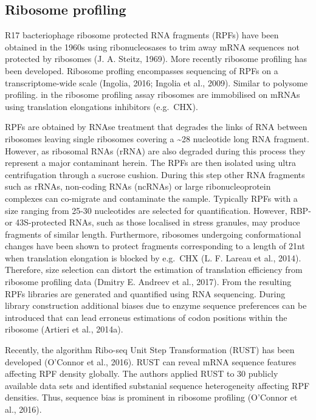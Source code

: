 \documentclass[12pt,openany]{book}
\begin{document}
\subsection{Ribosome profiling} \label{riboseq}

R17 bacteriophage ribosome protected RNA fragments (RPFs) have been
obtained in the 1960s using ribonucleosases to trim away mRNA sequences
not protected by ribosomes (J. A. Steitz, 1969). More recently ribosome
profiling has been developed. Ribosome profling encompasses sequencing
of RPFs on a transcriptome-wide scale (Ingolia, 2016; Ingolia et al.,
2009). Similar to polysome profiling. in the ribosome profiling assay
ribosomes are immobilised on mRNAs using translation elongations
inhibitors (e.g.~CHX).

RPFs are obtained by RNAse treatment that degrades the links of RNA
between ribosomes leaving single ribosomes covering a
\textasciitilde{}28 nucleotide long RNA fragment. However, as ribosomal
RNAs (rRNA) are also degraded during this process they represent a major
contaminant herein. The RPFs are then isolated using ultra
centrifugation through a sucrose cushion. During this step other RNA
fragments such as rRNAs, non-coding RNAs (ncRNAs) or large
ribonucleoprotein complexes can co-migrate and contaminate the sample.
Typically RPFs with a size ranging from 25-30 nucleotides are selected
for quantification. However, RBP-or 43S-protected RNAs, such as those
localised in stress granules, may produce fragments of similar length.
Furthermore, ribosomes undergoing conformational changes have been shown
to protect fragments corresponding to a length of 21nt when translation
elongation is blocked by e.g.~CHX (L. F. Lareau et al., 2014).
Therefore, size selection can distort the estimation of translation
efficiency from ribosome profiling data (Dmitry E. Andreev et al.,
2017). From the resulting RPFs libraries are generated and quantified
using RNA sequencing. During library construction additional biases due
to enzyme sequence preferences can be introduced that can lead erroneus
estimations of codon positions within the ribosome (Artieri et al.,
2014a).

Recently, the algorithm Ribo-seq Unit Step Transformation (RUST) has
been developed (O'Connor et al., 2016). RUST can reveal mRNA sequence
features affecting RPF density globally. The authors applied RUST to 30
publicly available data sets and identified substanial sequence
heterogeneity affecting RPF densities. Thus, sequence bias is prominent
in ribosome profiling (O'Connor et al., 2016).
\end{document}
